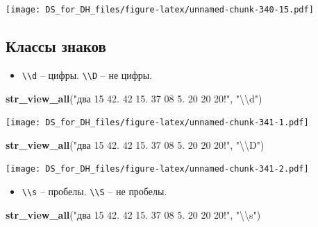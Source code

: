 \documentclass[
]{book}
\newenvironment{Shaded}{\begin{snugshade}}{\end{snugshade}}
\newcommand{\CharTok}[1]{\textcolor[rgb]{0.31,0.60,0.02}{#1}}
\newcommand{\KeywordTok}[1]{\textcolor[rgb]{0.13,0.29,0.53}{\textbf{#1}}}
\newcommand{\NormalTok}[1]{#1}
\newcommand{\StringTok}[1]{\textcolor[rgb]{0.31,0.60,0.02}{#1}}
\providecommand{\tightlist}{%
  \setlength{\itemsep}{0pt}\setlength{\parskip}{0pt}}
\begin{document}
\texttt{[image: DS\_for\_DH\_files/figure-latex/unnamed-chunk-340-15.pdf]}

\hypertarget{ux43aux43bux430ux441ux441ux44b-ux437ux43dux430ux43aux43eux432}{%
\subsection{Классы знаков}\label{ux43aux43bux430ux441ux441ux44b-ux437ux43dux430ux43aux43eux432}}

\begin{itemize}
\tightlist
\item
  \texttt{\textbackslash{}\textbackslash{}d} -- цифры. \texttt{\textbackslash{}\textbackslash{}D} -- не цифры.
\end{itemize}

\begin{Shaded}
\begin{Highlighting}[]
\KeywordTok{str_view_all}\NormalTok{(}\StringTok{"два 15 42. 42 15. 37 08 5. 20 20 20!"}\NormalTok{, }\StringTok{"}\CharTok{\textbackslash{}\textbackslash{}}\StringTok{d"}\NormalTok{)}
\end{Highlighting}
\end{Shaded}

\texttt{[image: DS\_for\_DH\_files/figure-latex/unnamed-chunk-341-1.pdf]}

\begin{Shaded}
\begin{Highlighting}[]
\KeywordTok{str_view_all}\NormalTok{(}\StringTok{"два 15 42. 42 15. 37 08 5. 20 20 20!"}\NormalTok{, }\StringTok{"}\CharTok{\textbackslash{}\textbackslash{}}\StringTok{D"}\NormalTok{)}
\end{Highlighting}
\end{Shaded}

\texttt{[image: DS\_for\_DH\_files/figure-latex/unnamed-chunk-341-2.pdf]}

\begin{itemize}
\tightlist
\item
  \texttt{\textbackslash{}\textbackslash{}s} -- пробелы. \texttt{\textbackslash{}\textbackslash{}S} -- не пробелы.
\end{itemize}

\begin{Shaded}
\begin{Highlighting}[]
\KeywordTok{str_view_all}\NormalTok{(}\StringTok{"два 15 42. 42 15. 37 08 5. 20 20 20!"}\NormalTok{, }\StringTok{"}\CharTok{\textbackslash{}\textbackslash{}}\StringTok{s"}\NormalTok{)}
\end{Highlighting}
\end{Shaded}
\end{document}
